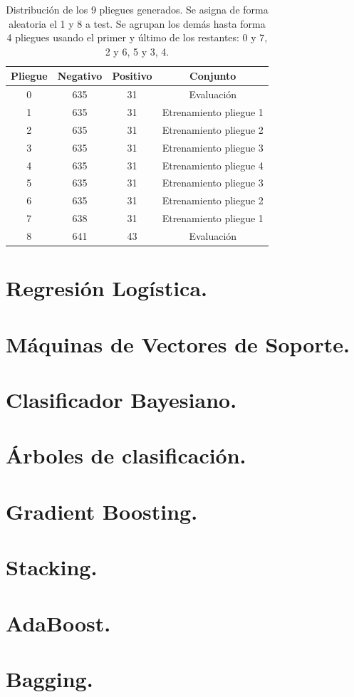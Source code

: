 \documentclass[12pt,letterpaper]{article}
\begin{document}
\begin{table}[!ht]
    \centering
    \begin{tabular}{|c|c|c|c|}
    \hline
    \textbf{Pliegue} & \textbf{Negativo} & \textbf{Positivo} & \textbf{Conjunto}\\ \hline
    0 & 635 & 31 & Evaluación \\ \hline
    1 & 635 & 31 & Etrenamiento pliegue 1 \\ \hline
    2 & 635 & 31 & Etrenamiento pliegue 2\\ \hline
        3 & 635 & 31 & Etrenamiento pliegue 3\\ \hline
        4 & 635 & 31 & Etrenamiento pliegue 4\\ \hline
        5 & 635 & 31 & Etrenamiento pliegue 3\\ \hline
        6 & 635 & 31 & Etrenamiento pliegue 2 \\ \hline
        7 & 638 & 31 & Etrenamiento pliegue 1\\ \hline
        8 & 641 & 43 & Evaluación \\ \hline
    \end{tabular}
    \caption{Distribución de los 9 pliegues generados. Se asigna de forma aleatoria el 1 y 8 a test. Se agrupan los demás hasta forma 4 pliegues usando el primer y último de los restantes: 0 y 7, 2 y 6, 5 y 3, 4.}
    \label{tab:ValidacionCruzada}
\end{table}

\section{Regresión Logística.}
\section{Máquinas de Vectores de Soporte.}
\section{Clasificador Bayesiano.}
\section{Árboles de clasificación.}
\section{Gradient Boosting.}
\section{Stacking.}
\section{AdaBoost.}
\section{Bagging.}
\printbibliography
\end{document}

